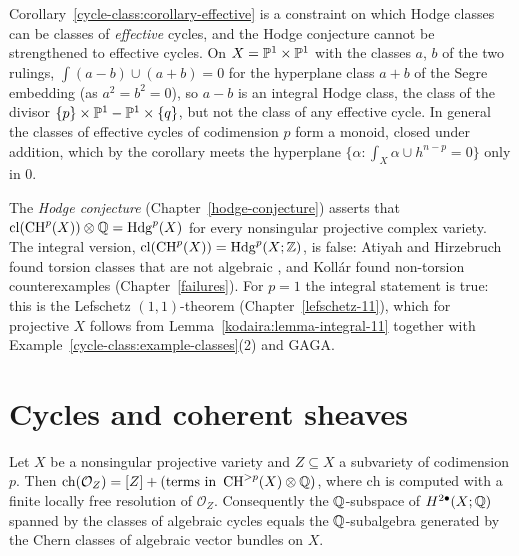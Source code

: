 \begin{counterexample}\label{cycle-class:counterexample-not-effective}
Corollary~\ref{cycle-class:corollary-effective} is a constraint on which Hodge classes can be classes of \emph{effective} cycles, and the Hodge conjecture cannot be strengthened to effective
cycles. On $X = \mathbb{P}^1 \times \mathbb{P}^1$ with the classes $a$, $b$ of the two rulings, $\int(a - b) \cup (a + b) = 0$ for the hyperplane class $a + b$ of the Segre embedding (as $a^2 = b^2 = 0$), so $a - b$ is an
integral Hodge class, the class of the divisor $\{p\} \times \mathbb{P}^1 - \mathbb{P}^1 \times \{q\}$, but not the class of any effective cycle. In general the classes of effective cycles of codimension $p$ form a monoid, closed under addition, which by the corollary meets the hyperplane
$\{\alpha : \int_X\alpha \cup h^{n-p} = 0\}$ only in $0$.
\end{counterexample}

\begin{remark}\label{cycle-class:remark-hodge-conjecture}
The \emph{Hodge conjecture} (Chapter~\ref{hodge-conjecture}) asserts that $\mathrm{cl}(\operatorname{CH}^p(X)) \otimes \mathbb{Q} = \mathrm{Hdg}^p(X)$ for every nonsingular projective complex variety. The
integral version, $\mathrm{cl}(\operatorname{CH}^p(X)) = \mathrm{Hdg}^p(X; \mathbb{Z})$, is false: Atiyah and Hirzebruch found torsion classes that are not algebraic \cite{atiyah-hirzebruch-1962}, and
Koll\'ar found non-torsion counterexamples (Chapter~\ref{failures}). For $p = 1$ the integral statement is true: this is the Lefschetz $(1,1)$-theorem
(Chapter~\ref{lefschetz-11}), which for projective $X$ follows from Lemma~\ref{kodaira:lemma-integral-11} together with Example~\ref{cycle-class:example-classes}(2) and GAGA.
\end{remark}

\section{Cycles and coherent sheaves}\label{cycle-class:section-chern-character}

\begin{proposition}\label{cycle-class:proposition-chern-character-cycle}
Let $X$ be a nonsingular projective variety and $Z \subseteq X$ a subvariety of codimension $p$. Then $\mathrm{ch}(\mathcal{O}_Z) = [Z] + (\text{terms in } \operatorname{CH}^{>p}(X) \otimes \mathbb{Q})$, where
$\mathrm{ch}$ is computed with a finite locally free resolution of $\mathcal{O}_Z$. Consequently the $\mathbb{Q}$-subspace of $H^{2\bullet}(X; \mathbb{Q})$ spanned by the classes of algebraic cycles equals the
$\mathbb{Q}$-subalgebra generated by the Chern classes of algebraic vector bundles on $X$.
\end{proposition}

